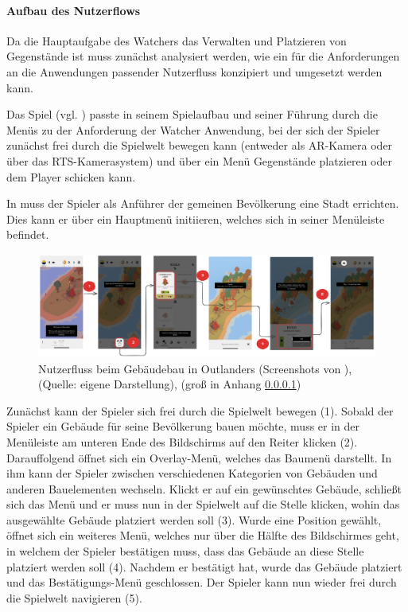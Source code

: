 \paragraph{Aufbau des Nutzerflows}
Da die Hauptaufgabe des Watchers das Verwalten und Platzieren von Gegenstände ist muss zunächst analysiert werden, wie ein für die Anforderungen an die Anwendungen passender Nutzerfluss konzipiert und umgesetzt werden kann.

Das Spiel  (vgl. \cite{noauthor_outlanders_2025}) passte in seinem Spielaufbau und seiner Führung durch die Menüs zu der Anforderung der Watcher Anwendung, bei der sich der Spieler zunächst frei durch die Spielwelt bewegen kann (entweder als \ac{AR}-Kamera oder über das RTS-Kamerasystem) und über ein Menü Gegenstände platzieren oder dem Player schicken kann.

In  muss der Spieler als Anführer der gemeinen Bevölkerung eine Stadt errichten. Dies kann er über ein Hauptmenü initiieren, welches sich in seiner Menüleiste befindet.

\begin{figure}[ht]
\centering
\includegraphics[width=1\linewidth]{content/pictures/Nutzerflow.png}
\caption{Nutzerfluss beim Gebäudebau in Outlanders (Screenshots von \cite{coates_game_nodate}), (Quelle: eigene Darstellung), (groß in Anhang \ref{})}
\label{fig:userflow-outlanders-build}
\end{figure}

Zunächst kann der Spieler sich frei durch die Spielwelt bewegen (1). Sobald der Spieler ein Gebäude für seine Bevölkerung bauen möchte, muss er in der Menüleiste am unteren Ende des Bildschirms auf den Reiter  klicken (2). Darauffolgend öffnet sich ein Overlay-Menü, welches das Baumenü darstellt. In ihm kann der Spieler zwischen verschiedenen Kategorien von Gebäuden und anderen Bauelementen wechseln. Klickt er auf ein gewünschtes Gebäude, schließt sich das Menü und er muss nun in der Spielwelt auf die Stelle klicken, wohin das ausgewählte Gebäude platziert werden soll (3). Wurde eine Position gewählt, öffnet sich ein weiteres Menü, welches nur über die Hälfte des Bildschirmes geht, in welchem der Spieler bestätigen muss, dass das Gebäude an diese Stelle platziert werden soll (4). Nachdem er bestätigt hat, wurde das Gebäude platziert und das Bestätigungs-Menü geschlossen. Der Spieler kann nun wieder frei durch die Spielwelt navigieren (5).

